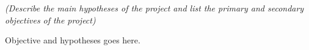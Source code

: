 %
%
\textit{(Describe the main hypotheses of the project and list the primary and secondary objectives of the project)}
\vspace{1cm}

Objective and hypotheses goes here.
